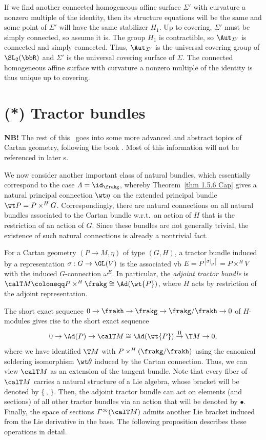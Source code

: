 If we find another connected homogeneous affine surface $\varSigma'$ with curvature a nonzero multiple of the identity, then its structure equations will be the same and some point of $\varSigma'$ will have the same stabilizer $H_1$. Up to covering, $\varSigma'$ must be simply connected, so assume it is. The group $H_1$ is contractible, so $\Aut_{\varSigma'}$ is connected and simply connected. Thus, $\Aut_{\varSigma'}$ is the universal covering group of $\SL_2(\bbR)$ and $\varSigma'$ is the universal covering surface of $\varSigma$. The connected homogeneous affine surface with curvature a nonzero multiple of the identity is thus unique up to covering.





\section{(*) Tractor bundles}\label{sec: tractor bundles}

\textbf{NB!} The rest of this \chap\ goes into some more advanced and abstract topics of Cartan geometry, following the book \cite{Cap}. Most of this information will not be referenced in later \chap s.

We now consider another important class of natural bundles, which essentially correspond to the case $\varLambda=\id_\frakg$, whereby Theorem~\ref{thm 1.5.6 Cap} gives a natural principal connection $\wt\eta$ on the extended principal bundle $\wt P=P\times^H G$. Correspondingly, there are natural connections on all natural bundles associated to the Cartan bundle w.r.t.\ an action of $H$ that is the restriction of an action of $G$. Since these bundles are not generally trivial, the existence of such natural connections is already a nontrivial fact.

\begin{defn}
    For a Cartan geometry $(P\to M,\eta)$ of type $(G,H)$, a tractor bundle induced by a representation $\sigma:G\to \GL(V)$ is the associated \gls{vb} $E=P^{[\sigma|_H]}=P\times^H V$ with the induced $G$-connection $\omega^E$. In particular, the \emph{adjoint tractor bundle} is $\calT M\coloneqq P\times^H \frakg\cong \Ad(\wt{P})$, where $H$ acts by restriction of the adjoint representation.
\end{defn}

The short exact sequence $0\to\frakh\to\frakg\to\frakg\slash\frakh\to 0$ of $H$-modules gives rise to the short exact sequence 
\[0\to\Ad(P)\to \calT M\cong \Ad(\wt{P})\overset{\Pi}{\to} \T M\to 0,\]
where we have identified $\T M$ with $P\times^H (\frakg\slash\frakh)$ using the canonical soldering isomorphism $\wt\theta$ induced by the Cartan connection. Thus, we can view $\calT M$ as an extension of the tangent bundle. Note that every fiber of $\calT M$ carries a natural structure of a Lie algebra, whose bracket will be denoted by $\{\,,\,\}$. Then, the adjoint tractor bundle can act on elements (and sections) of all other tractor bundles via an action that will be denoted by $\bullet$. Finally, the space of sections $\varGamma^\infty(\calT M)$ admits another Lie bracket induced from the Lie derivative in the base. The following proposition describes these operations in detail.

